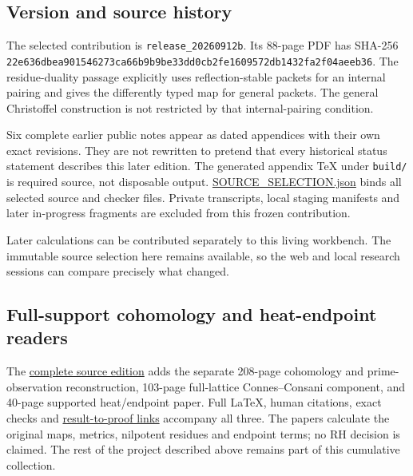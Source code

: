 \documentclass[
]{article}
\begin{document}
\subsection{Version and source
history}\label{version-and-source-history}

The selected contribution is \texttt{release\_20260912b}. Its 88-page
PDF has SHA-256
\texttt{22e636dbea901546273ca66b9b9be33dd0cb2fe1609572db1432fa2f04aeeb36}.
The residue-duality passage explicitly uses reflection-stable packets
for an internal pairing and gives the differently typed map for general
packets. The general Christoffel construction is not restricted by that
internal-pairing condition.

Six complete earlier public notes appear as dated appendices with their
own exact revisions. They are not rewritten to pretend that every
historical status statement describes this later edition. The generated
appendix TeX under \texttt{build/} is required source, not disposable
output. \url{SOURCE_SELECTION.json} binds all selected source and
checker files. Private transcripts, local staging manifests and later
in-progress fragments are excluded from this frozen contribution.

Later calculations can be contributed separately to this living
workbench. The immutable source selection here remains available, so the
web and local research sessions can compare precisely what changed.

\subsection{Full-support cohomology and heat-endpoint
readers}\label{full-support-cohomology-and-heat-endpoint-readers}

The
\href{https://github.com/KokunoYumeto/zeta-function-research-reader/tree/main/workbenches/splitzero-tandem/continuations/20260923-cohomology-heat-residue}{complete
source edition} adds the separate 208-page cohomology and
prime-observation reconstruction, 103-page full-lattice Connes--Consani
component, and 40-page supported heat/endpoint paper. Full LaTeX, human
citations, exact checks and
\href{https://github.com/KokunoYumeto/zeta-function-research-reader/blob/main/workbenches/splitzero-tandem/continuations/20260923-cohomology-heat-residue/RESULTS_AND_PROOF_LINKS.json}{result-to-proof
links} accompany all three. The papers calculate the original maps,
metrics, nilpotent residues and endpoint terms; no RH decision is
claimed. The rest of the project described above remains part of this
cumulative collection.
\end{document}
